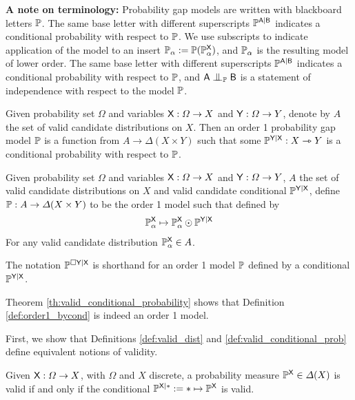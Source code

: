 \textbf{A note on terminology:} Probability gap models are written with blackboard letters $\mathbb{P}$. The same base letter with different superscripts $\mathbb{P}^{\mathsf{A}|\mathsf{B}}$ indicates a conditional probability with respect to $\mathbb{P}$. We use subscripts to indicate application of the model to an insert $\mathbb{P}_\alpha:=\mathbb{P}(\mathbb{P}^{\mathsf{X}}_\alpha)$, and $\mathbb{P}_\alpha$ is the resulting model of lower order. The same base letter with different superscripts $\mathbb{P}^{\mathsf{A}|\mathsf{B}}$ indicates a conditional probability with respect to $\mathbb{P}$, and $\RV{A}\CI_{\prob{P}} \RV{B}$ is a statement of independence with respect to the model $\mathbb{P}$.

\begin{definition}
Given probability set $\Omega$ and variables $\mathsf{X}:\Omega\to X$ and $\mathsf{Y}:\Omega\to Y$, denote by $A$ the set of valid candidate distributions on $X$. Then an order 1 probability gap model $\mathbb{P}$ is a function from $A\to \Delta(X\times Y)$ such that some $\mathbb{P}^{\mathsf{Y}|\mathsf{X}}:X\rightarrowtriangle Y$ is a conditional probability with respect to $\mathbb{P}$.
\end{definition}

\begin{definition}\label{def:order1_bycond}
Given probability set $\Omega$ and variables $\mathsf{X}:\Omega\to X$ and $\mathsf{Y}:\Omega\to Y$, $A$ the set of valid candidate distributions on $X$ and valid candidate conditional $\mathbb{P}^{\mathsf{Y}|\mathsf{X}}$, define $\mathbb{P}:A\to \Delta(X\times Y)$ to be the order 1 model such that defined by
\begin{align}
	\mathbb{P}_\alpha^{\mathsf{X}} \mapsto \mathbb{P}_\alpha^{\mathsf{X}}\odot\mathbb{P}^{\mathsf{Y}|\mathsf{X}}
\end{align}
For any valid candidate distribution $\mathbb{P}_\alpha^{\mathsf{X}}\in A$.
\end{definition}

The notation $\mathbb{P}^{\square \mathsf{Y}|\mathsf{X}}$ is shorthand for an order 1 model $\mathbb{P}$ defined by a conditional $\mathbb{P}^{\mathsf{Y}|\mathsf{X}}$.

Theorem \ref{th:valid_conditional_probability} shows that Definition \ref{def:order1_bycond} is indeed an order 1 model.

First, we show that Definitions \ref{def:valid_dist} and \ref{def:valid_conditional_prob} define equivalent notions of validity.

\begin{lemma}\label{th:valid_agree}
Given $\mathsf{X}:\Omega\to X$, with $\Omega$ and $X$ discrete, a probability measure $\mathbb{P}^{\mathsf{X}}\in \Delta(X)$ is valid if and only if the conditional $\mathbb{P}^{\mathsf{X}|*}:=*\mapsto \mathbb{P}^{\mathsf{X}}$ is valid.
\end{lemma}

